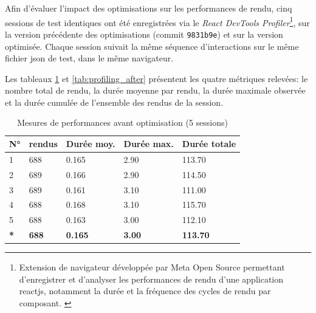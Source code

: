 Afin d'évaluer l'impact des optimisations sur les performances de rendu, cinq sessions de test identiques ont été enregistrées via le \textit{React DevTools Profiler}\footnote{Extension de navigateur développée par Meta Open Source permettant d'enregistrer et d'analyser les performances de rendu d'une application \gls{reactjs}, notamment la durée et la fréquence des cycles de rendu par composant. \parencite{noauthor_react_nodate}}, sur la version précédente des optimisations (commit \texttt{9831b9e}) et sur la version optimisée. Chaque session suivait la même séquence d’interactions sur le même fichier \gls{json} de test, dans le même navigateur.

Les tableaux \ref{tab:profiling_before} et \ref{tab:profiling_after} présentent les quatre métriques relevées: le nombre total de \gls{rendu}, la durée moyenne par \gls{rendu}, la durée maximale observée et la durée cumulée de l'ensemble des \glspl{rendu} de la session.

\begin{table}[H]
    \centering
    \caption{Mesures de performances avant optimisation (5 sessions)}
    \renewcommand{\arraystretch}{1.5}
    \begin{tabular}{p{0.8cm} p{2.5cm} p{2.5cm} p{2.5cm} p{2.7cm}}
        \hline
        \textbf{N°} & \textbf{\Glspl{rendu}} & \textbf{Durée moy.} & \textbf{Durée max.} & \textbf{Durée totale} \\
        \hline
        1 & 688 & 0.165 & 2.90 & 113.70 \\
        2 & 689 & 0.166 & 2.90 & 114.50 \\
        3 & 689 & 0.161 & 3.10 & 111.00 \\
        4 & 688 & 0.168 & 3.10 & 115.70 \\
        5 & 688 & 0.163 & 3.00 & 112.10 \\
        \hline
        \textbf{*} & \textbf{688} & \textbf{0.165} & \textbf{3.00} & \textbf{113.70} \\
        \hline
    \end{tabular}
    \par{}
    \label{tab:profiling_before}
\end{table}

